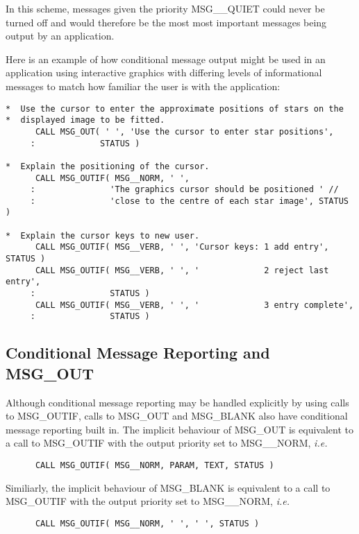 In this scheme, messages given the priority MSG\_\_QUIET could never be 
turned off and would therefore be the most most important messages being
output by an application.

Here is an example of how conditional message output might be used 
in an application using interactive graphics with differing levels of 
informational messages to match how familiar the user is with the application:

\begin {small}
\begin{verbatim}
*  Use the cursor to enter the approximate positions of stars on the 
*  displayed image to be fitted.
      CALL MSG_OUT( ' ', 'Use the cursor to enter star positions', 
     :             STATUS )

*  Explain the positioning of the cursor.
      CALL MSG_OUTIF( MSG__NORM, ' ', 
     :               'The graphics cursor should be positioned ' //
     :               'close to the centre of each star image', STATUS )

*  Explain the cursor keys to new user.
      CALL MSG_OUTIF( MSG__VERB, ' ', 'Cursor keys: 1 add entry', STATUS )
      CALL MSG_OUTIF( MSG__VERB, ' ', '             2 reject last entry', 
     :               STATUS )
      CALL MSG_OUTIF( MSG__VERB, ' ', '             3 entry complete', 
     :               STATUS )
\end{verbatim}
\end {small}


\subsection {Conditional Message Reporting and MSG\_OUT}

Although conditional message reporting may be handled explicitly by using calls
to MSG\_OUTIF, calls to MSG\_OUT and MSG\_BLANK also have conditional message
reporting built in.
The implicit behaviour of MSG\_OUT is equivalent to a call to MSG\_OUTIF with 
the output priority set to MSG\_\_NORM, {\em i.e.}

\begin{verbatim}
      CALL MSG_OUTIF( MSG__NORM, PARAM, TEXT, STATUS )
\end{verbatim}

Similiarly, the implicit behaviour of MSG\_BLANK is equivalent to a call to
MSG\_OUTIF with the output priority set to MSG\_\_NORM, {\em i.e.}

\begin{verbatim}
      CALL MSG_OUTIF( MSG__NORM, ' ', ' ', STATUS )
\end{verbatim}

